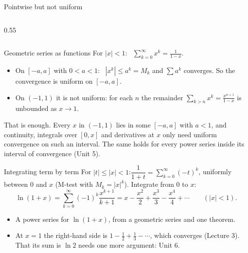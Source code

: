 \documentclass[10pt]{wosm-slides}
\begin{document}
\begin{frame}{Pointwise but not uniform}
\begin{columns}[c]
\begin{column}{0.55\textwidth}
    \end{column}
  \end{columns}
\end{frame}

\begin{frame}{Geometric series as functions}
  For $|x| < 1$: \ $\displaystyle\sum_{k=0}^\infty x^k = \frac{1}{1-x}$.
  \begin{itemize}
    \item On $[-a, a]$ with $0 < a < 1$: \ $|x^k| \le a^k = M_k$ and $\sum a^k$ converges.
      So the convergence is uniform on $[-a, a]$.
    \item On $(-1, 1)$ it is not uniform: for each $n$ the remainder
      $\sum_{k > n} x^k = \frac{x^{n+1}}{1-x}$ is unbounded as $x \to 1$.
  \end{itemize}
  \pause
  \begin{remark}
    That is enough. Every $x$ in $(-1, 1)$ lies in some $[-a, a]$ with $a < 1$, and continuity,
    integrals over $[0, x]$ and derivatives at $x$ only need uniform convergence on such an
    interval. The same holds for every power series inside its interval of convergence (Unit 5).
  \end{remark}
\end{frame}

\begin{frame}{Integrating term by term}
  For $|t| \le |x| < 1$:\quad $\dfrac{1}{1+t} = \sum_{k=0}^\infty (-t)^k$, uniformly
  between $0$ and $x$ (M-test with $M_k = |x|^k$). Integrate from $0$ to $x$:
  \[ \ln(1 + x) = \sum_{k=0}^\infty (-1)^k \frac{x^{k+1}}{k+1}
     = x - \frac{x^2}{2} + \frac{x^3}{3} - \frac{x^4}{4} + \cdots \qquad (|x| < 1) . \]
  \pause
  \begin{itemize}
    \item A power series for $\ln(1 + x)$, from a geometric series and one theorem.
    \item At $x = 1$ the right-hand side is $1 - \frac12 + \frac13 - \cdots$, which converges
      (Lecture 3). That its sum is $\ln 2$ needs one more argument: Unit 6.
  \end{itemize}
\end{frame}
\end{document}
